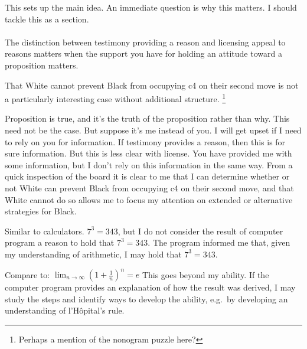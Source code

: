 \documentclass[10pt]{article}
\begin{document}
\begin{note}
  This sets up the main idea.
  An immediate question is why this matters.
  I should tackle this as a section.
\end{note}






\paragraph{ }
The distinction between testimony providing a reason and licensing appeal to reasons matters when the support you have for holding an attitude toward a proposition matters.

That White cannot prevent Black from occupying c4 on their second move is not a particularly interesting case without additional structure.\nolinebreak
\footnote{
  Perhaps a mention of the nonogram puzzle here?
}

Proposition is true, and it's the truth of the proposition rather than why.
This need not be the case.
But suppose it's me instead of you.
I will get upset if I need to rely on you for information.
If testimony provides a reason, then this is for sure information.
But this is less clear with license.
You have provided me with some information, but I don't rely on this information in the same way.
From a quick inspection of the board it is clear to me that I can determine whether or not White can prevent Black from occupying c4 on their second move, and that White cannot do so allows me to focus my attention on extended or alternative strategies for Black.

Similar to calculators.
\(7^{3} = 343\), but I do not consider the result of computer program a reason to hold that \(7^{3} = 343\).
The program informed me that, given my understanding of arithmetic, I may hold that \(7^{3} = 343\).

Compare to:
\(\lim_{n \to \infty}\left(1 + \frac{1}{n} \right)^{n} = e\)
This goes beyond my ability.
If the computer program provides an explanation of how the result was derived, I may study the steps and identify ways to develop the ability, e.g.\ by developing an understanding of l'H\^{o}pital's rule.
\end{document}
